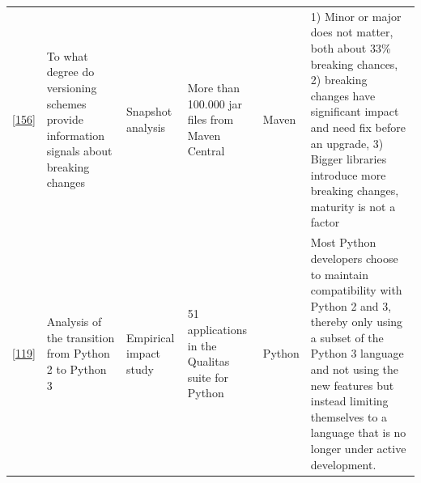 \documentclass[]{book}
\begin{document}
\begin{longtable}[]{@{}llllll@{}}
\begin{minipage}[t]{0.10\columnwidth}
{[}\protect\hyperlink{ref-Raemaekers2017}{156}{]}\strut
\end{minipage} & \begin{minipage}[t]{0.18\columnwidth}\raggedright\strut
To what degree do versioning schemes provide information signals about
breaking changes\strut
\end{minipage} & \begin{minipage}[t]{0.19\columnwidth}\raggedright\strut
Snapshot analysis\strut
\end{minipage} & \begin{minipage}[t]{0.11\columnwidth}\raggedright\strut
More than 100.000 jar files from Maven Central\strut
\end{minipage} & \begin{minipage}[t]{0.13\columnwidth}\raggedright\strut
Maven\strut
\end{minipage} & \begin{minipage}[t]{0.11\columnwidth}\raggedright\strut
1) Minor or major does not matter, both about 33\% breaking chances, 2)
breaking changes have significant impact and need fix before an upgrade,
3) Bigger libraries introduce more breaking changes, maturity is not a
factor\strut
\end{minipage}\tabularnewline
\begin{minipage}[t]{0.10\columnwidth}\raggedright\strut
{[}\protect\hyperlink{ref-Malloy2018}{119}{]}\strut
\end{minipage} & \begin{minipage}[t]{0.18\columnwidth}\raggedright\strut
Analysis of the transition from Python 2 to Python 3\strut
\end{minipage} & \begin{minipage}[t]{0.19\columnwidth}\raggedright\strut
Empirical impact study\strut
\end{minipage} & \begin{minipage}[t]{0.11\columnwidth}\raggedright\strut
51 applications in the Qualitas suite for Python\strut
\end{minipage} & \begin{minipage}[t]{0.13\columnwidth}\raggedright\strut
Python\strut
\end{minipage} & \begin{minipage}[t]{0.11\columnwidth}\raggedright\strut
Most Python developers choose to maintain compatibility with Python 2
and 3, thereby only using a subset of the Python 3 language and not
using the new features but instead limiting themselves to a language
that is no longer under active development.\strut

\end{minipage}
\end{longtable}
\end{document}
